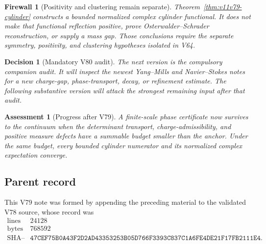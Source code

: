 \documentclass[11pt]{article}
\newtheorem{assessment}[theorem]{Assessment}
\newtheorem{firewall}[theorem]{Firewall}
\newtheorem{decision}[theorem]{Decision}
\begin{document}
\begin{firewall}[Positivity and clustering remain separate]
\label{fire:v11v79-boundary}
Theorem~\ref{thm:v11v79-cylinder} constructs a bounded normalized
complex cylinder functional.  It does not make that functional
reflection positive, prove Osterwalder--Schrader reconstruction, or
supply a mass gap.  Those conclusions require the separate symmetry,
positivity, and clustering hypotheses isolated in V64.
\end{firewall}

\begin{decision}[Mandatory V80 audit]
\label{dec:v11v79-next}
The next version is the compulsory companion audit.  It will inspect
the newest Yang--Mills and Navier--Stokes notes for a new charge-gap,
phase-transport, decay, or refinement estimate.  The following
substantive version will attack the strongest remaining input after
that audit.
\end{decision}

\begin{assessment}[Progress after V79]
\label{ass:v11v79-status}
A finite-scale phase certificate now survives to the continuum when
the determinant transport, charge-admissibility, and positive measure
defects have a summable budget smaller than the anchor.  Under the
same budget, every bounded cylinder numerator and its normalized
complex expectation converge.
\end{assessment}

\subsection{Parent record}

This V79 note was formed by appending the preceding material to the
validated V78 source, whose record was
\[
\begin{array}{c|c}
\text{lines}&24128\\
\text{bytes}&768592\\
\text{SHA--256}&
\texttt{47CEF75B0A43F2D2AD43353253B05D766F3393C837C1A6FE4DE21F17FB2111E4}.
\end{array}                                                     \tag{79.23}
\]

\end{document}

